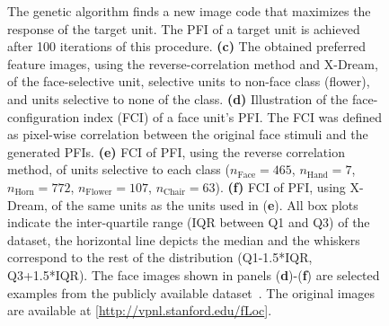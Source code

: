 \documentclass[sn-mathphys-num]{sn-jnl}%
\theoremstyle{thmstyleone}%
\theoremstyle{thmstyletwo}%
\theoremstyle{thmstylethree}%
\begin{document}
\begin{figure}[!htb]
{		The genetic algorithm finds a new image code that maximizes the response of the target unit.
		The PFI of a target unit is achieved after 100 iterations of this procedure.
		\textbf{(c)} The obtained preferred feature images, using the reverse-correlation method and X-Dream, of the face-selective unit, selective units to non-face class (flower), and units selective to none of the class.
		\textbf{(d)} Illustration of the face-configuration index (FCI) of a face unit's PFI.
		The FCI was defined as pixel-wise correlation between the original face stimuli and the generated PFIs.
		\textbf{(e)} FCI of PFI, using the reverse correlation method, of units selective to each class ($ n_\textrm{Face} = 465 $, $ n_\textrm{Hand} = 7 $, $ n_\textrm{Horn} = 772 $, $ n_\textrm{Flower} = 107 $, $ n_\textrm{Chair} = 63 $).
		\textbf{(f)} FCI of PFI, using X-Dream, of the same units as the units used in (\textbf{e}).
		All box plots indicate the inter-quartile range (IQR between Q1 and Q3) of the dataset,
		the horizontal line depicts the median and the whiskers correspond to the rest of the distribution (Q1-1.5*IQR, Q3+1.5*IQR).
		The face images shown in panels (\textbf{d})-(\textbf{f}) are selected examples from the publicly available dataset~\cite{stigliani2015temporal}.
		The original images are available at [\url{http://vpnl.stanford.edu/fLoc}].
	} \label{fig:preferred}
\end{figure}
\end{document}
